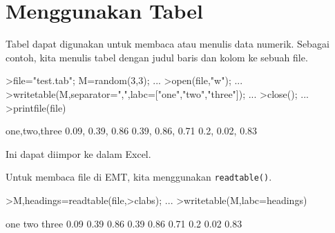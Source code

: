 \documentclass[a4paper,11pt,oneside,enabledeprecatedfontcommands]{scrbook}
\newenvironment{eulernotebook}{}{}
\newcommand{\eulerheading}[1]{\chapter{#1}}
\newenvironment{eulercomment}{\par\medskip\noindent}{\par\medskip}
\begin{document}
\begin{eulernotebook}
		\eulerheading{Menggunakan Tabel}
		\begin{eulercomment}
			Tabel dapat digunakan untuk membaca atau menulis data numerik. Sebagai contoh, kita menulis tabel
			dengan judul baris dan kolom ke sebuah file.
		\end{eulercomment}
		\begin{eulerprompt}
			>file="test.tab"; M=random(3,3);  ...
			>open(file,"w");  ...
			>writetable(M,separator=",",labc=["one","two","three"]);  ...
			>close(); ...
			>printfile(file)
		\end{eulerprompt}
		\begin{euleroutput}
			one,two,three
			      0.09,      0.39,      0.86
			      0.39,      0.86,      0.71
			       0.2,      0.02,      0.83
		\end{euleroutput}
		\begin{eulercomment}
			Ini dapat diimpor ke dalam Excel.
			
			Untuk membaca file di EMT, kita menggunakan \texttt{readtable()}.
		\end{eulercomment}
		\begin{eulerprompt}
			>{M,headings}=readtable(file,>clabs); ...
			>writetable(M,labc=headings)
		\end{eulerprompt}
		\begin{euleroutput}
			       one       two     three
			      0.09      0.39      0.86
			      0.39      0.86      0.71
			       0.2      0.02      0.83
		\end{euleroutput}
		

\end{eulernotebook}
\end{document}
